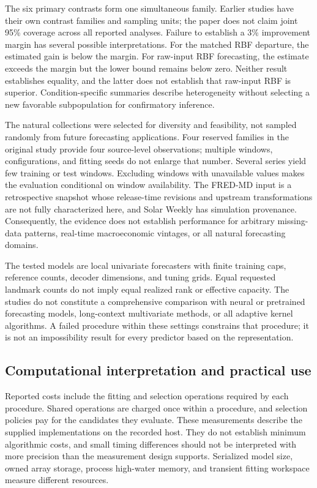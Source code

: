 The six primary contrasts form one simultaneous family. Earlier studies
have their own contrast families and sampling units; the paper does not
claim joint 95\% coverage across all reported analyses. Failure to
establish a 3\% improvement margin has several possible interpretations.
For the matched RBF departure, the estimated gain is below the margin.
For raw-input RBF forecasting, the estimate exceeds the margin but the
lower bound remains below zero. Neither result establishes equality,
and the latter does not establish that raw-input RBF is superior.
Condition-specific summaries describe heterogeneity without selecting a
new favorable subpopulation for confirmatory inference.

The natural collections were selected for diversity and feasibility,
not sampled randomly from future forecasting applications. Four reserved
families in the original study provide four source-level observations;
multiple windows, configurations, and fitting seeds do not enlarge that
number. Several series yield few training or test windows. Excluding
windows with unavailable values makes the evaluation conditional on
window availability. The FRED-MD input is a retrospective snapshot whose
release-time revisions and upstream transformations are not fully
characterized here, and Solar Weekly has simulation provenance.
Consequently, the evidence does not establish performance for arbitrary
missing-data patterns, real-time macroeconomic vintages, or all natural
forecasting domains.

The tested models are local univariate forecasters with finite training
caps, reference counts, decoder dimensions, and tuning grids. Equal
requested landmark counts do not imply equal realized rank or effective
capacity. The studies do not constitute a comprehensive comparison with
neural or pretrained forecasting models, long-context multivariate
methods, or all adaptive kernel algorithms. A failed procedure within
these settings constrains that procedure; it is not an impossibility
result for every predictor based on the representation.

\subsection{Computational interpretation and practical use}
Reported costs include the fitting and selection operations required by
each procedure. Shared operations are charged once within a procedure,
and selection policies pay for the candidates they evaluate. These
measurements describe the supplied implementations on the recorded host.
They do not establish minimum algorithmic costs, and small timing
differences should not be interpreted with more precision than the
measurement design supports. Serialized model size, owned array storage,
process high-water memory, and transient fitting workspace measure
different resources.

